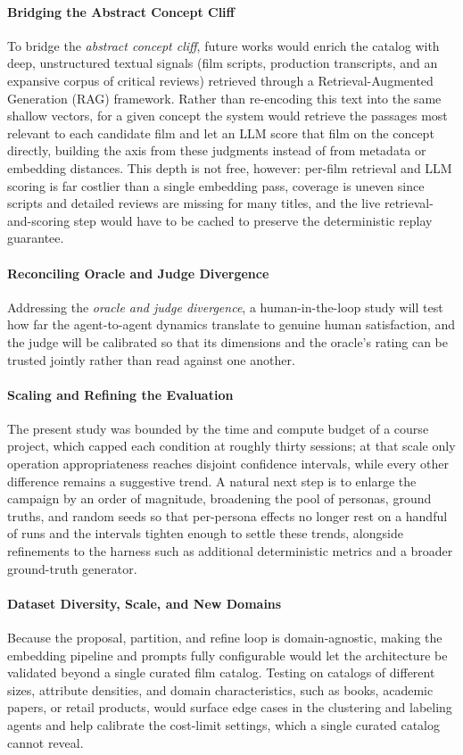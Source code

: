 \paragraph{Bridging the Abstract Concept Cliff}
To bridge the \emph{abstract concept cliff}, future works would enrich the catalog with deep, unstructured textual signals (film scripts, production transcripts, and an expansive corpus of critical reviews) retrieved through a Retrieval-Augmented Generation (RAG) framework.
Rather than re-encoding this text into the same shallow vectors, for a given concept the system would retrieve the passages most relevant to each candidate film and let an LLM score that film on the concept directly, building the axis from these judgments instead of from metadata or embedding distances.
This depth is not free, however: per-film retrieval and LLM scoring is far costlier than a single embedding pass, coverage is uneven since scripts and detailed reviews are missing for many titles, and the live retrieval-and-scoring step would have to be cached to preserve the deterministic replay guarantee.

\paragraph{Reconciling Oracle and Judge Divergence}
Addressing the \emph{oracle and judge divergence}, a human-in-the-loop study will test how far the agent-to-agent dynamics translate to genuine human satisfaction, and the judge will be calibrated so that its dimensions and the oracle's rating can be trusted jointly rather than read against one another.

\paragraph{Scaling and Refining the Evaluation}
The present study was bounded by the time and compute budget of a course project, which capped each condition at roughly thirty sessions; at that scale only operation appropriateness reaches disjoint confidence intervals, while every other difference remains a suggestive trend. 
A natural next step is to enlarge the campaign by an order of magnitude, broadening the pool of personas, ground truths, and random seeds so that per-persona effects no longer rest on a handful of runs and the intervals tighten enough to settle these trends, alongside refinements to the harness such as additional deterministic metrics and a broader ground-truth generator.

\paragraph{Dataset Diversity, Scale, and New Domains}
Because the proposal, partition, and refine loop is domain-agnostic, making the embedding pipeline and prompts fully configurable would let the architecture be validated beyond a single curated film catalog.
Testing on catalogs of different sizes, attribute densities, and domain characteristics, such as books, academic papers, or retail products, would surface edge cases in the clustering and labeling agents and help calibrate the cost-limit settings, which a single curated catalog cannot reveal.